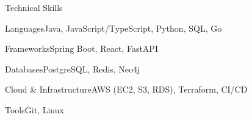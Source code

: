 \documentclass[
	11pt
]{../../../template}
\begin{document}
	\begin{rSection}{T}{echnical Skills}
		\begin{rSet}{Languages}{Java, JavaScript/TypeScript, Python, SQL, Go}
		\end{rSet}
		\begin{rSet}{Frameworks}{Spring Boot, React, FastAPI}
		\end{rSet}
		\begin{rSet}{Databases}{PostgreSQL, Redis, Neo4j}
		\end{rSet}
		\begin{rSet}{Cloud \& Infrastructure}{AWS (EC2, S3, RDS), Terraform, CI/CD}
		\end{rSet}
		\begin{rSet}{Tools}{Git, Linux}
		\end{rSet}
	\end{rSection}
\end{document}
